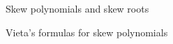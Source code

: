 \documentclass[11pt,a4paper]{article}
\theoremstyle{theorem}
\numberwithin{equation}{section}
\begin{document}
\begin{section}{Skew polynomials and skew roots}
\begin{subsection}{Vieta's formulas for skew polynomials }
\end{subsection}

\end{section} 
\end{document}
